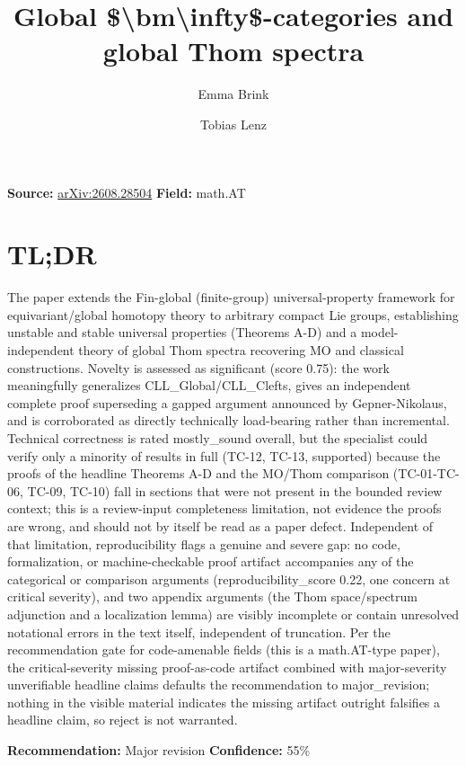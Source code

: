 \documentclass[11pt]{article}
\title{Global \$\textbackslash{}bm\textbackslash{}infty\$-categories and global Thom spectra}
\author{Emma Brink \and Tobias Lenz}
\date{}
\begin{document}
\maketitle

\noindent\textbf{Source:} \href{https://arxiv.org/abs/2608.28504}{arXiv:2608.28504} \quad \textbf{Field:} math.AT\\

\section*{TL;DR}
The paper extends the Fin-global (finite-group) universal-property framework for equivariant/global homotopy theory to arbitrary compact Lie groups, establishing unstable and stable universal properties (Theorems A-D) and a model-independent theory of global Thom spectra recovering MO and classical constructions. Novelty is assessed as significant (score 0.75): the work meaningfully generalizes CLL\_Global/CLL\_Clefts, gives an independent complete proof superseding a gapped argument announced by Gepner-Nikolaus, and is corroborated as directly technically load-bearing rather than incremental. Technical correctness is rated mostly\_sound overall, but the specialist could verify only a minority of results in full (TC-12, TC-13, supported) because the proofs of the headline Theorems A-D and the MO/Thom comparison (TC-01-TC-06, TC-09, TC-10) fall in sections that were not present in the bounded review context; this is a review-input completeness limitation, not evidence the proofs are wrong, and should not by itself be read as a paper defect. Independent of that limitation, reproducibility flags a genuine and severe gap: no code, formalization, or machine-checkable proof artifact accompanies any of the categorical or comparison arguments (reproducibility\_score 0.22, one concern at critical severity), and two appendix arguments (the Thom space/spectrum adjunction and a localization lemma) are visibly incomplete or contain unresolved notational errors in the text itself, independent of truncation. Per the recommendation gate for code-amenable fields (this is a math.AT-type paper), the critical-severity missing proof-as-code artifact combined with major-severity unverifiable headline claims defaults the recommendation to major\_revision; nothing in the visible material indicates the missing artifact outright falsifies a headline claim, so reject is not warranted.

\textbf{Recommendation:} Major revision \quad \textbf{Confidence:} 55\%\\
\end{document}
